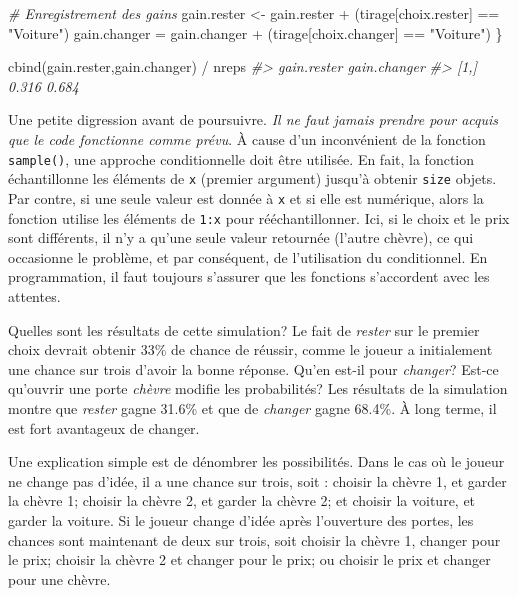 \documentclass[
]{book}
\newenvironment{Shaded}{}{}
\newcommand{\CommentTok}[1]{\textit{#1}}
\newcommand{\FunctionTok}[1]{#1}
\newcommand{\NormalTok}[1]{#1}
\newcommand{\OtherTok}[1]{#1}
\newcommand{\SpecialCharTok}[1]{#1}
\newcommand{\StringTok}[1]{#1}
\begin{document}
\begin{Shaded}
\begin{Highlighting}[]
  \CommentTok{\# Enregistrement des gains}
\NormalTok{  gain.rester }\OtherTok{\textless{}{-}}\NormalTok{ gain.rester }\SpecialCharTok{+}\NormalTok{ (tirage[choix.rester] }\SpecialCharTok{==} \StringTok{"Voiture"}\NormalTok{)}
\NormalTok{  gain.changer }\OtherTok{=}\NormalTok{ gain.changer }\SpecialCharTok{+}\NormalTok{ (tirage[choix.changer] }\SpecialCharTok{==} \StringTok{"Voiture"}\NormalTok{)}
\NormalTok{\}}

\FunctionTok{cbind}\NormalTok{(gain.rester,gain.changer)  }\SpecialCharTok{/}\NormalTok{ nreps}
\CommentTok{\#\textgreater{}      gain.rester gain.changer}
\CommentTok{\#\textgreater{} [1,]       0.316        0.684}
\end{Highlighting}
\end{Shaded}

Une petite digression avant de poursuivre. \emph{Il ne faut jamais prendre pour acquis que le code fonctionne comme prévu}. À cause d'un inconvénient de la fonction \texttt{sample()}, une approche conditionnelle doit être utilisée. En fait, la fonction échantillonne les éléments de \texttt{x} (premier argument) jusqu'à obtenir \texttt{size} objets. Par contre, si une seule valeur est donnée à \texttt{x} et si elle est numérique, alors la fonction utilise les éléments de \texttt{1:x} pour rééchantillonner. Ici, si le choix et le prix sont différents, il n'y a qu'une seule valeur retournée (l'autre chèvre), ce qui occasionne le problème, et par conséquent, de l'utilisation du conditionnel. En programmation, il faut toujours s'assurer que les fonctions s'accordent avec les attentes.

Quelles sont les résultats de cette simulation? Le fait de \emph{rester} sur le premier choix devrait obtenir 33\% de chance de réussir, comme le joueur a initialement une chance sur trois d'avoir la bonne réponse. Qu'en est-il pour \emph{changer}? Est-ce qu'ouvrir une porte \emph{chèvre} modifie les probabilités? Les résultats de la simulation montre que \emph{rester} gagne 31.6\% et que de \emph{changer} gagne 68.4\%. À long terme, il est fort avantageux de changer.

Une explication simple est de dénombrer les possibilités. Dans le cas où le joueur ne change pas d'idée, il a une chance sur trois, soit : choisir la chèvre 1, et garder la chèvre 1; choisir la chèvre 2, et garder la chèvre 2; et choisir la voiture, et garder la voiture. Si le joueur change d'idée après l'ouverture des portes, les chances sont maintenant de deux sur trois, soit choisir la chèvre 1, changer pour le prix; choisir la chèvre 2 et changer pour le prix; ou choisir le prix et changer pour une chèvre.
\end{document}
